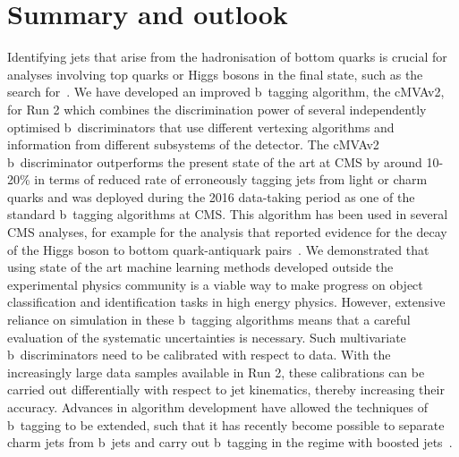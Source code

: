 \section{Summary and outlook}
Identifying jets that arise from the hadronisation of bottom quarks is crucial for analyses involving top quarks or Higgs bosons in the final state, such as the search for~\ttHbb. We have developed an improved b~tagging algorithm, the cMVAv2, for Run 2 which combines the discrimination power of several independently optimised b~discriminators that use different vertexing algorithms and information from different subsystems of the detector. The cMVAv2 b~discriminator outperforms the present state of the art at CMS by around 10-20\% in terms of reduced rate of erroneously tagging jets from light or charm quarks and was deployed during the 2016 data-taking period as one of the standard b~tagging algorithms at CMS. This algorithm has been used in several CMS analyses, for example for the analysis that reported evidence for the decay of the Higgs boson to bottom quark-antiquark pairs~\cite{Sirunyan:2017elk}. We demonstrated that using state of the art machine learning methods developed outside the experimental physics community is a viable way to make progress on object classification and identification tasks in high energy physics. However, extensive reliance on simulation in these b~tagging algorithms means that a careful evaluation of the systematic uncertainties is necessary. Such multivariate b~discriminators need to be calibrated with respect to data. With the increasingly large data samples available in Run 2, these calibrations can be carried out differentially with respect to jet kinematics, thereby increasing their accuracy. Advances in algorithm development have allowed the techniques of b~tagging to be extended, such that it has recently become possible to separate charm jets from b~jets and carry out b~tagging in the regime with boosted jets~\cite{Sirunyan:2017ezt}.